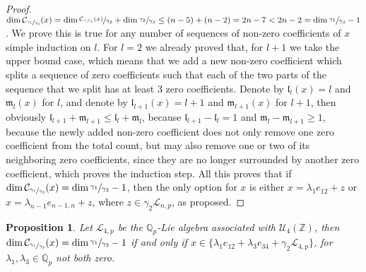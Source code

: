 \documentclass[12pt]{article}
\newtheorem{proposition}[theorem]{Proposition}
\begin{document}
\begin{proof}
$\dim\mathcal{C}_{\sfrac{\gamma_1}{\gamma_3}}(x)=\dim\sfrac{\mathcal{C}_{\sfrac{\gamma_1}{\gamma_3}}(x)}{\gamma_2}+\dim\sfrac{\gamma_2}{\gamma_3}\leq (n-5)+(n-2)=2n-7<2n-2=\dim\sfrac{\gamma_1}{\gamma_3}-1$. We prove this is true for any number of sequences of non-zero coefficients of $x$ simple induction on $l$. For $l=2$ we already proved that, for $l+1$ we take the upper bound case, which means that we add a new non-zero coefficient which splits a sequence of zero coefficients such that each of the two parts of the sequence that we split has at least $3$ zero coefficients. Denote by $\mathfrak{l}_l(x)=l$ and $\mathfrak{m}_l(x)$ for $l$, and denote by $\mathfrak{l}_{l+1}(x)=l+1$ and $\mathfrak{m}_{l+1}(x)$ for $l+1$, then obviously $\mathfrak{l}_{l+1}+\mathfrak{m}_{l+1}\leq\mathfrak{l}_l+\mathfrak{m}_l$, because $\mathfrak{l}_{l+1}-\mathfrak{l}_l=1$ and $\mathfrak{m}_{l}-\mathfrak{m}_{l+1}\geq 1$, because the newly added non-zero coefficient does not only remove one zero coefficient from the total count, but may also remove one or two of its neighboring zero coefficients, since they are no longer surrounded by another zero coefficient, which proves the induction step. All this proves that if $\dim\mathcal{C}_{\sfrac{\gamma_1}{\gamma_3}}(x)=\dim\sfrac{\gamma_1}{\gamma_3}-1$, then the only option for $x$ is either $x=\lambda_1 e_{12}+z$ or $x=\lambda_{n-1}e_{n-1,n}+z$, where $z\in\gamma_2\mathcal{L}_{n,p}$, as proposed.
\end{proof}
\begin{proposition}
\label{prop.n.geq.4.centralizer.codimension}
Let $\mathcal{L}_{4,p}$ be the $\mathbb{Q}_p$-Lie algebra associated with $\mathcal{U}_4(\mathbb{Z})$, then $\dim\mathcal{C}_{\sfrac{\gamma_1}{\gamma_3}}(x)=\dim\sfrac{\gamma_1}{\gamma_3}-1$ if and only if $x\in\{\lambda_1 e_{12}+\lambda_3 e_{34}+\gamma_2\mathcal{L}_{4,p}\}$, for $\lambda_1,\lambda_3\in\mathbb{Q}_p$ not both zero.
\end{proposition}
\end{document}
